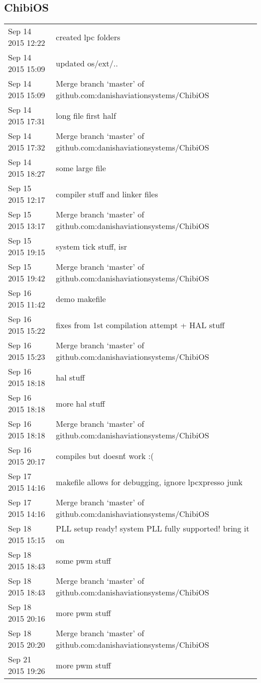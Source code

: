 \subsection{ChibiOS}

\begin{tabular}{ l || p{9.5cm} }
	\hline			
	Sep 14 2015 12:22	& created lpc folders	\\
	Sep 14 2015 15:09	& updated os/ext/..	\\
	Sep 14 2015 15:09	& Merge branch `master' of github.com:danishaviationsystems/ChibiOS	\\
	Sep 14 2015 17:31	& long file first half	\\
	Sep 14 2015 17:32	& Merge branch `master' of github.com:danishaviationsystems/ChibiOS	\\
	Sep 14 2015 18:27	& some large file	\\
	Sep 15 2015 12:17	& compiler stuff and linker files	\\
	Sep 15 2015 13:17	& Merge branch `master' of github.com:danishaviationsystems/ChibiOS	\\
	Sep 15 2015 19:15	& system tick stuff, isr	\\
	Sep 15 2015 19:42	& Merge branch `master' of github.com:danishaviationsystems/ChibiOS	\\
	Sep 16 2015 11:42	& demo makefile	\\
	Sep 16 2015 15:22	& fixes from 1st compilation attempt + HAL stuff	\\
	Sep 16 2015 15:23	& Merge branch `master' of github.com:danishaviationsystems/ChibiOS	\\
	Sep 16 2015 18:18	& hal stuff	\\
	Sep 16 2015 18:18	& more hal stuff	\\
	Sep 16 2015 18:18	& Merge branch `master' of github.com:danishaviationsystems/ChibiOS	\\
	Sep 16 2015 20:17	& compiles but doesn\'t work :(	\\
	Sep 17 2015 14:16	& makefile allows for debugging, ignore lpcxpresso junk	\\
	Sep 17 2015 14:16	& Merge branch `master' of github.com:danishaviationsystems/ChibiOS	\\
	Sep 18 2015 15:15	& PLL setup ready! system PLL fully supported! bring it on	\\
	Sep 18 2015 18:43	& some pwm stuff	\\
	Sep 18 2015 18:43	& Merge branch `master' of github.com:danishaviationsystems/ChibiOS	\\
	Sep 18 2015 20:16	& more pwm stuff	\\
	Sep 18 2015 20:20	& Merge branch `master' of github.com:danishaviationsystems/ChibiOS	\\
	Sep 21 2015 19:26	& more pwm stuff	\\
	\hline  
\end{tabular}
